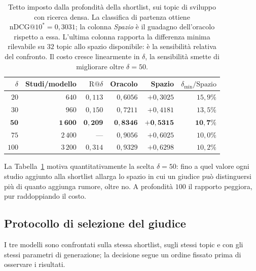 \documentclass[pdflatex,sn-mathphys-num]{sn-jnl}
\theoremstyle{thmstyleone}
\theoremstyle{thmstyletwo}
\theoremstyle{thmstylethree}
\begin{document}
\begin{table}[H]
\centering
\begin{tabular}{rrrrrr}
\toprule
$\delta$ & Studi/modello & $\mathrm{R@}\delta$ & Oracolo & Spazio & $\delta_{\min}/\text{Spazio}$ \\
\midrule
$20$  & $640$   & $0{,}113$ & $0{,}6056$ & $+0{,}3025$ & $15{,}9\%$ \\
$30$  & $960$   & $0{,}150$ & $0{,}7211$ & $+0{,}4181$ & $13{,}5\%$ \\
$\mathbf{50}$ & $\mathbf{1\,600}$ & $\mathbf{0{,}209}$ & $\mathbf{0{,}8346}$ & $\mathbf{+0{,}5315}$ & $\mathbf{10{,}7\%}$ \\
$75$  & $2\,400$ & --- & $0{,}9056$ & $+0{,}6025$ & $10{,}0\%$ \\
$100$ & $3\,200$ & $0{,}314$ & $0{,}9329$ & $+0{,}6298$ & $10{,}2\%$ \\
\bottomrule
\end{tabular}
\caption{Tetto imposto dalla profondità della shortlist, sui topic di sviluppo con ricerca densa. La classifica di partenza ottiene $\mathrm{nDCG@}10^{*} = 0{,}3031$; la colonna \emph{Spazio} è il guadagno dell'oracolo rispetto a essa. L'ultima colonna rapporta la differenza minima rilevabile su $32$ topic allo spazio disponibile: è la sensibilità relativa del confronto. Il costo cresce linearmente in $\delta$, la sensibilità smette di migliorare oltre $\delta = 50$.}
\label{tab:profondita}
\end{table}

La Tabella~\ref{tab:profondita} motiva quantitativamente la scelta $\delta = 50$: fino a quel valore ogni studio aggiunto alla shortlist allarga lo spazio in cui un giudice può distinguersi più di quanto aggiunga rumore, oltre no. A profondità $100$ il rapporto peggiora, pur raddoppiando il costo.

\subsection{Protocollo di selezione del giudice}\label{sec:selezione-giudice}

I tre modelli sono confrontati sulla stessa shortlist, sugli stessi topic e con
gli stessi parametri di generazione; la decisione segue un ordine fissato prima
di osservare i risultati.
\end{document}
